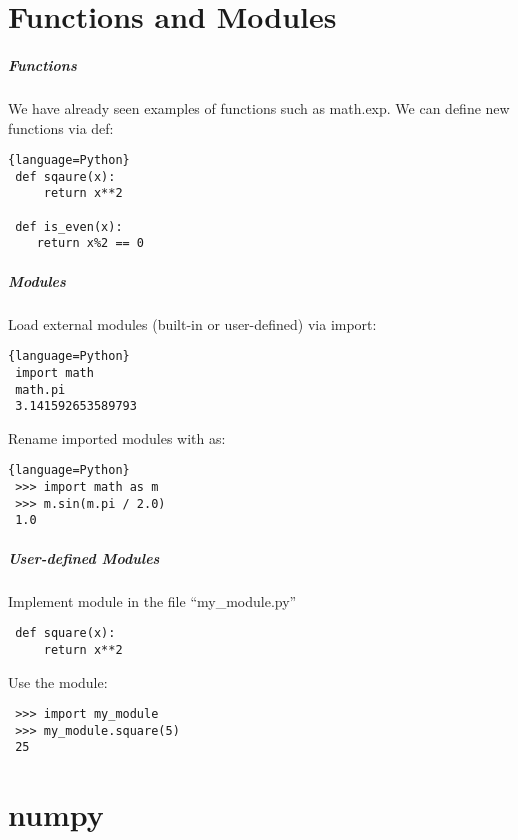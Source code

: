 \documentclass[hyperref={colorlinks, linkcolor=blue, urlcolor=blue}]{beamer}
\begin{document}
\part{Functions and Modules} 

\begin{frame}[fragile]
  \frametitle{Functions}

  We have already seen examples of functions such as math.exp.
  We can define new functions via def:
  \begin{lstlisting}{language=Python}
 def sqaure(x):
     return x**2

 def is_even(x):
    return x%2 == 0
  \end{lstlisting}
\end{frame}


\begin{frame}[fragile]
  \frametitle{Modules}

  Load external modules (built-in or user-defined) via import:
  \begin{lstlisting}{language=Python}
 import math 
 math.pi
 3.141592653589793 
  \end{lstlisting}
  Rename imported modules with as:
  \begin{lstlisting}{language=Python}
 >>> import math as m
 >>> m.sin(m.pi / 2.0)
 1.0
  \end{lstlisting}
\end{frame}

\begin{frame}[fragile]
  \frametitle{User-defined Modules}
  Implement module in the file ``my\_module.py''
  \begin{lstlisting}
 def square(x):
     return x**2
  \end{lstlisting}
  Use the module:
  \begin{lstlisting}
 >>> import my_module
 >>> my_module.square(5)
 25
  \end{lstlisting}
\end{frame}

\part{numpy} 
\end{document}
